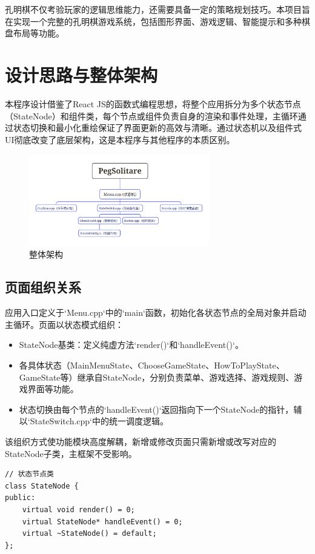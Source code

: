 \documentclass[12pt, a4paper]{article}
\begin{document}
孔明棋不仅考验玩家的逻辑思维能力，还需要具备一定的策略规划技巧。本项目旨在实现一个完整的孔明棋游戏系统，包括图形界面、游戏逻辑、智能提示和多种棋盘布局等功能。

\section{设计思路与整体架构}

本程序设计借鉴了React JS的函数式编程思想，将整个应用拆分为多个状态节点（StateNode）和组件类，每个节点或组件负责自身的渲染和事件处理，主循环通过状态切换和最小化重绘保证了界面更新的高效与清晰。通过状态机以及组件式UI彻底改变了底层架构，这是本程序与其他程序的本质区别。

\begin{figure}[h]
  \centering
  \includegraphics[width=0.7\textwidth]{Orgnazation.png}
  \caption{整体架构}
  \label{fig:architecture}
\end{figure}

\subsection{页面组织关系}
应用入口定义于`Menu.cpp`中的`main`函数，初始化各状态节点的全局对象并启动主循环。页面以状态模式组织：

\begin{itemize}
  \item StateNode基类：定义纯虚方法`render()`和`handleEvent()`。  \item 各具体状态（MainMenuState、ChooseGameState、HowToPlayState、GameState等）继承自StateNode，分别负责菜单、游戏选择、游戏规则、游戏界面等功能。  \item 状态切换由每个节点的`handleEvent()`返回指向下一个StateNode的指针，辅以`StateSwitch.cpp`中的统一调度逻辑。
\end{itemize}
该组织方式使功能模块高度解耦，新增或修改页面只需新增或改写对应的StateNode子类，主框架不受影响。

\begin{lstlisting}
// 状态节点类
class StateNode {
public:
    virtual void render() = 0;
    virtual StateNode* handleEvent() = 0;
    virtual ~StateNode() = default;
};
\end{lstlisting}
\end{document}
